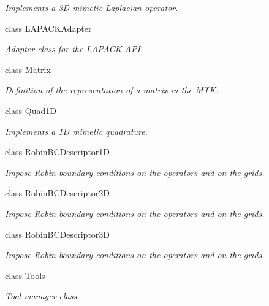 \begin{DoxyCompactItemize}
\begin{DoxyCompactList}\small\item\em Implements a 3\+D mimetic Laplacian operator. \end{DoxyCompactList}\item 
class \hyperlink{classmtk_1_1LAPACKAdapter}{L\+A\+P\+A\+C\+K\+Adapter}
\begin{DoxyCompactList}\small\item\em Adapter class for the L\+A\+P\+A\+C\+K A\+P\+I. \end{DoxyCompactList}\item 
class \hyperlink{classmtk_1_1Matrix}{Matrix}
\begin{DoxyCompactList}\small\item\em Definition of the representation of a matrix in the M\+T\+K. \end{DoxyCompactList}\item 
class \hyperlink{classmtk_1_1Quad1D}{Quad1\+D}
\begin{DoxyCompactList}\small\item\em Implements a 1\+D mimetic quadrature. \end{DoxyCompactList}\item 
class \hyperlink{classmtk_1_1RobinBCDescriptor1D}{Robin\+B\+C\+Descriptor1\+D}
\begin{DoxyCompactList}\small\item\em Impose Robin boundary conditions on the operators and on the grids. \end{DoxyCompactList}\item 
class \hyperlink{classmtk_1_1RobinBCDescriptor2D}{Robin\+B\+C\+Descriptor2\+D}
\begin{DoxyCompactList}\small\item\em Impose Robin boundary conditions on the operators and on the grids. \end{DoxyCompactList}\item 
class \hyperlink{classmtk_1_1RobinBCDescriptor3D}{Robin\+B\+C\+Descriptor3\+D}
\begin{DoxyCompactList}\small\item\em Impose Robin boundary conditions on the operators and on the grids. \end{DoxyCompactList}\item 
class \hyperlink{classmtk_1_1Tools}{Tools}
\begin{DoxyCompactList}\small\item\em Tool manager class. \end{DoxyCompactList}\item 

\end{DoxyCompactItemize}
